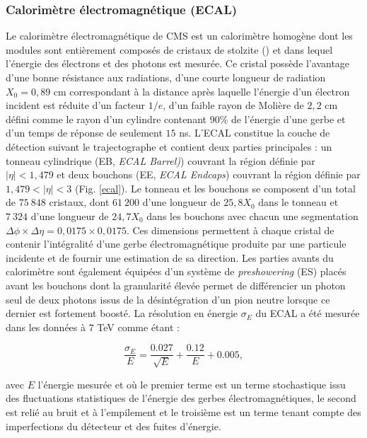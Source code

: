 \subsubsection{ Calorimètre électromagnétique (ECAL)}

Le calorimètre électromagnétique de CMS est un calorimètre homogène dont les modules sont entièrement composés de cristaux de stolzite () et dans lequel l'énergie des électrons et des photons est mesurée. Ce cristal possède l'avantage d'une bonne résistance aux radiations, d'une courte longueur de radiation $X_0=0,89$ cm correspondant à la distance après laquelle l'énergie d'un électron incident est réduite d'un facteur $1/e$, d'un faible rayon de Molière de $2,2$ cm défini comme le rayon d'un cylindre contenant $90\%$ de l'énergie d'une gerbe et d'un temps de réponse de seulement $15$ ns. L'ECAL constitue la couche de détection suivant le trajectographe et contient deux parties principales : un tonneau cylindrique (EB, \textit{ECAL Barrel)}) couvrant la région définie par $|\eta|<1,479$ et deux bouchons (EE, \textit{ECAL Endcaps}) couvrant la région définie par $1,479<|\eta|<3$ (Fig. \ref{ecal}). Le tonneau et les bouchons se composent d'un total de $75~848$ cristaux, dont $61~200$ d'une longueur de $25,8X_0$ dans le tonneau et $7~324$ d'une longueur de $24,7X_0$ dans les bouchons avec chacun une segmentation $\Delta\phi\times\Delta\eta=0,0175\times0,0175$. Ces dimensions permettent à chaque cristal de contenir l'intégralité d'une gerbe électromagnétique produite par une particule incidente et de fournir une estimation de sa direction. Les parties avants du calorimètre sont également équipées d'un système de \textit{preshowering} (ES) placés avant les bouchons dont la granularité élevée permet de différencier un photon seul de deux photons issus de la désintégration d'un pion neutre lorsque ce dernier est fortement boosté. La résolution en énergie $\sigma_E$ du ECAL a été mesurée dans les données à $7$ TeV \cite{ECALres} comme étant :

\begin{equation}
    \frac{\sigma_E}{E}=\frac{0.027}{\sqrt{E}}+\frac{0.12}{E}+0.005,
\end{equation}

avec $E$ l'énergie mesurée et où le premier terme est un terme stochastique issu des fluctuations statistiques de l'énergie des gerbes électromagnétiques, le second est relié au bruit et à l'empilement et le troisième est un terme tenant compte des imperfections du détecteur et des fuites d'énergie.

